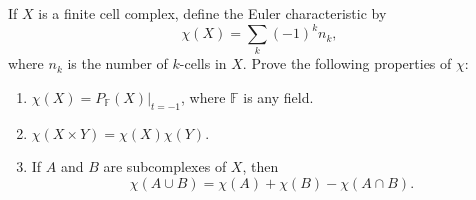 \begin{problem}
If \(X\) is a finite cell complex, define the Euler characteristic by
\[
\chi(X)=\sum_k (-1)^k n_k,
\]
where \(n_k\) is the number of \(k\)-cells in \(X\). Prove the following properties of \(\chi\):
\begin{enumerate}
	\item[(a)] \(\chi(X)=P_{\mathbb F}(X)\big|_{t=-1}\), where \(\mathbb F\) is any field.
	\item[(b)] \(\chi(X\times Y)=\chi(X)\chi(Y)\).
	\item[(c)] If \(A\) and \(B\) are subcomplexes of \(X\), then
	\[
	\chi(A\cup B)=\chi(A)+\chi(B)-\chi(A\cap B).
	\]
\end{enumerate}
\end{problem}

